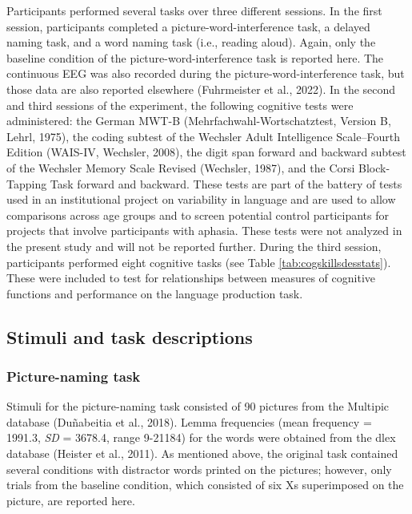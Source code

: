 \documentclass[
  man,floatsintext]{apa6}
\begin{document}
Participants performed several tasks over three different sessions. In the first session, participants completed a picture-word-interference task, a delayed naming task, and a word naming task (i.e., reading aloud). Again, only the baseline condition of the picture-word-interference task is reported here. The continuous EEG was also recorded during the picture-word-interference task, but those data are also reported elsewhere (Fuhrmeister et al., 2022). In the second and third sessions of the experiment, the following cognitive tests were administered: the German MWT-B (Mehrfachwahl-Wortschatztest, Version B, Lehrl, 1975), the coding subtest of the Wechsler Adult Intelligence Scale--Fourth Edition (WAIS-IV, Wechsler, 2008), the digit span forward and backward subtest of the Wechsler Memory Scale Revised (Wechsler, 1987), and the Corsi Block-Tapping Task forward and backward. These tests are part of the battery of tests used in an institutional project on variability in language and are used to allow comparisons across age groups and to screen potential control participants for projects that involve participants with aphasia. These tests were not analyzed in the present study and will not be reported further. During the third session, participants performed eight cognitive tasks (see Table \ref{tab:cogskillsdesstats}). These were included to test for relationships between measures of cognitive functions and performance on the language production task.

\hypertarget{stimuli-and-task-descriptions}{%
\subsection{Stimuli and task descriptions}\label{stimuli-and-task-descriptions}}

\hypertarget{picture-naming-task}{%
\subsubsection{Picture-naming task}\label{picture-naming-task}}

Stimuli for the picture-naming task consisted of 90 pictures from the Multipic database (Duñabeitia et al., 2018). Lemma frequencies (mean frequency = 1991.3, \emph{SD} = 3678.4, range 9-21184) for the words were obtained from the dlex database (Heister et al., 2011). As mentioned above, the original task contained several conditions with distractor words printed on the pictures; however, only trials from the baseline condition, which consisted of six Xs superimposed on the picture, are reported here.
\end{document}
